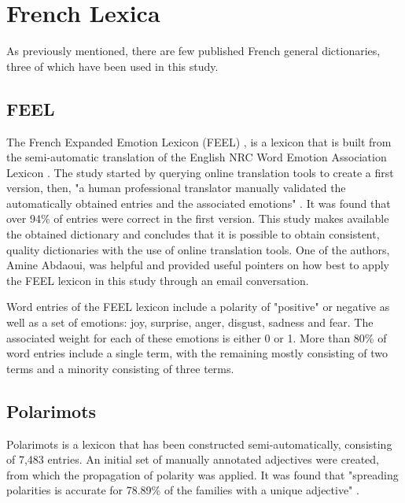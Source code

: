 \section{French Lexica}\label{French Lexicons}

As previously mentioned, there are few published French general dictionaries, three of which have been used in this study.

\subsection{FEEL}\label{chap: feel}

The French Expanded Emotion Lexicon (FEEL) \citep{abdaoui2017feel}, is a lexicon that is built from the semi-automatic translation of the English NRC Word Emotion Association Lexicon \citep{mohammad2013crowdsourcing}. The study started by querying online translation tools to create a first version, then, "a human professional translator manually validated the automatically obtained entries and the associated emotions" \citep{abdaoui2017feel}. It was found that over 94\% of entries were correct in the first version. This study makes available the obtained dictionary and concludes that it is possible to obtain consistent, quality dictionaries with the use of online translation tools. One of the authors, Amine Abdaoui, was helpful and provided useful pointers on how best to apply the FEEL lexicon in this study through an email conversation.

Word entries of the FEEL lexicon include a polarity of "positive" or negative as well as a set of emotions: joy, surprise, anger, disgust, sadness and fear. The associated weight for each of these emotions is either 0 or 1. More than 80\% of word entries include a single term, with the remaining mostly consisting of two terms and a minority consisting of three terms.

\subsection{Polarimots}\label{chap: polarimots}

Polarimots \citep{gala2012propagation} is a lexicon that has been constructed semi-automatically, consisting of 7,483 entries. An initial set of manually annotated adjectives were created, from which the propagation of polarity was applied. It was found that "spreading polarities is accurate for 78.89\% of the families with a unique adjective" \citep{gala2012propagation}.

